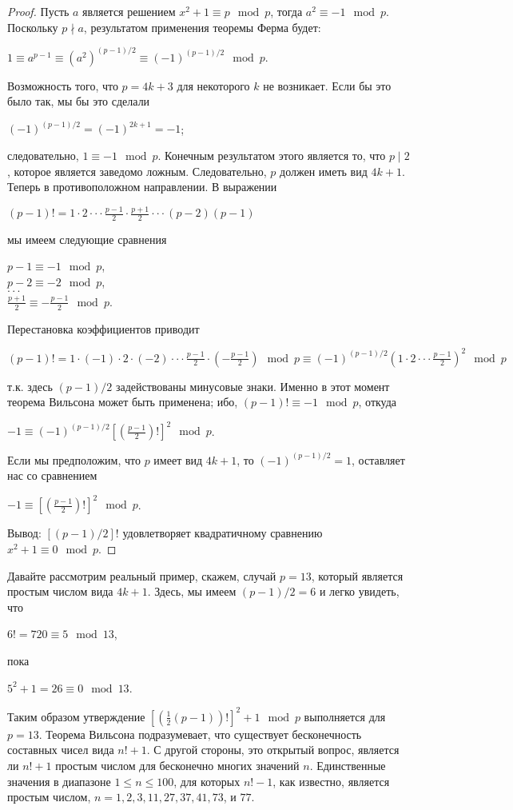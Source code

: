 \documentclass[11pt]{article}
\begin{document}
\begin{proof}
	Пусть $a$ является решением $x^2+1\equiv p\mod p$, тогда $a^2\equiv-1\mod p$. Поскольку $p\nmid a$, результатом применения теоремы Ферма будет:
	\begin{center}
		$1\equiv a^{p-1}\equiv (a^2)^{(p-1)/2}\equiv (-1)^{(p-1)/2}\mod p.$
	\end{center}
Возможность того, что $p=4k+3$ для некоторого $k$ не возникает. Если бы это было так, мы бы это сделали
\begin{center}
	$(-1)^{(p-1)/2}=(-1)^{2k+1}=-1$;
\end{center}
следовательно, $1\equiv-1\mod p$. Конечным результатом этого является то, что $p\mid2$, которое является заведомо ложным. Следовательно, $p$ должен иметь вид $4k+1$.
Теперь в противоположном направлении. В выражении
\begin{center}
	$(p-1)!=1\cdot2\cdot\cdot\cdot\frac{p-1}{2}\cdot\frac{p+1}{2}\cdot\cdot\cdot(p-2)(p-1)$
\end{center}
мы имеем следующие сравнения
\begin{center}
	$p-1\equiv-1\mod p$,
	\\$p-2\equiv-2\mod p$,
	\\$\cdot\cdot\cdot$
	\\$\frac{p+1}{2}\equiv-\frac{p-1}{2}\mod p$.
\end{center}
Перестановка коэффициентов приводит 
\begin{center}
	$(p-1)!=1\cdot(-1)\cdot2\cdot(-2)\cdot\cdot\cdot\frac{p-1}{2}\cdot(-\frac{p-1}{2})\mod p\equiv(-1)^{(p-1)/2}(1\cdot2\cdot\cdot\cdot\frac{p-1}{2})^2\mod p$
\end{center}
т.к. здесь $(p-1)/2$ задействованы минусовые знаки. Именно в этот момент теорема Вильсона может быть применена; ибо, $(p-1)!\equiv-1\mod p$, откуда 
\begin{center}
	$-1\equiv(-1)^{(p-1)/2}[(\frac{p-1}{2})!]^2\mod p$.
\end{center}
Если мы предположим, что $p$ имеет вид $4k+1$, то $(-1)^{(p-1)/2}=1$, оставляет нас со сравнением 
\begin{center}
	$-1\equiv[(\frac{p-1}{2})!]^2\mod p$.
\end{center}
Вывод: $[(p-1)/2]!$ удовлетворяет квадратичному сравнению $x^2+1\equiv 0 \mod p$.
\end{proof}
Давайте рассмотрим реальный пример, скажем, случай $p=13$, который является простым числом вида $4k+1$. Здесь, мы имеем $(p-1)/2=6$ и легко увидеть, что 
\begin{center}
	$6!=720\equiv5\mod13$,
\end{center}
пока
\begin{center}
	$5^2+1=26\equiv0\mod13$.
\end{center}
Таким образом утверждение $[(\frac{1}{2}(p-1))!]^2+1\mod p$ выполняется для $p=13$.
Теорема Вильсона подразумевает, что существует бесконечность составных чисел вида $n!+1$. С другой стороны, это открытый вопрос, является ли $n!+1$ простым числом для бесконечно многих значений $n$. Единственные значения в диапазоне $1\le n\le100$, для которых $n!-1$, как известно, является простым числом, $n=1,2,3,11,27,37,41,73$, и $77$. 
\end{document}
